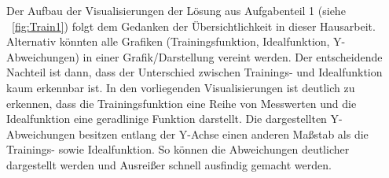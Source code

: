 \documentclass[11pt,a4paper]{scrreprt}
\newcommand{\abbildung}[1]{\figurename\ \ref{#1}}
\begin{document}
Der Aufbau der Visualisierungen der Lösung aus Aufgabenteil 1 (siehe \abbildung{fig:Train1}) folgt dem Gedanken der Übersichtlichkeit in dieser Hausarbeit. Alternativ könnten alle Grafiken (Trainingsfunktion, Idealfunktion, Y-Abweichungen) in einer Grafik/Darstellung vereint werden. Der entscheidende Nachteil ist dann, dass der Unterschied zwischen Trainings- und Idealfunktion kaum erkennbar ist. In den vorliegenden Visualisierungen ist deutlich zu erkennen, dass die Trainingsfunktion eine Reihe von Messwerten und die Idealfunktion eine geradlinige Funktion darstellt. Die dargestellten Y-Abweichungen besitzen entlang der Y-Achse einen anderen Maßstab als die Trainings- sowie Idealfunktion. So können die Abweichungen deutlicher dargestellt werden und Ausreißer schnell ausfindig gemacht werden. 
\end{document}
